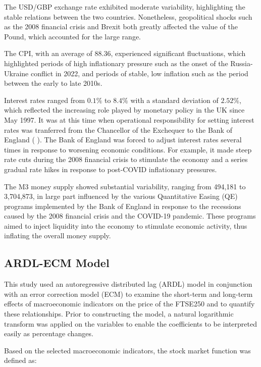 \documentclass[11pt,a4paper]{article}
\newcommand{\citeboth}[1]{\citeauthor{#1} \citep{#1}}
\begin{document}
The USD/GBP exchange rate exhibited moderate variability, highlighting the stable relations between 
the two countries. Nonetheless, geopolitical shocks such as the 2008 financial crisis and Brexit both greatly affected the value of the Pound, 
which accounted for the large range. 

The CPI, with an average of 88.36, 
experienced significant fluctuations, which highlighted periods of high inflationary pressure such as the onset of the Russia-Ukraine conflict in 2022, and periods of stable, low
inflation such as the period between the early to late 2010s.

Interest rates ranged from $0.1\%$ to $8.4\%$ with a standard deviation of $2.52\%$, which reflected the 
increasing role played by monetary policy in the UK since May 1997. It was at this time when operational responsibility for setting interest rates was tranferred from the Chancellor of the Exchequer to the Bank of England (\citeboth{king1997changes}). 
The Bank of England was forced to adjust interest rates 
several times in response to worsening economic conditions. For example, 
it made steep rate cuts during the 2008 financial crisis
to stimulate the economy and a series gradual rate hikes in response to 
post-COVID inflationary pressures. 

The M3 money supply showed substantial variability, ranging from 494,181 to 3,704,873, 
in large part influenced by the various Quantitative Easing (QE) programs implemented by the Bank of England 
in response to the recessions caused by the 2008 financial crisis and the COVID-19 pandemic. These programs aimed to inject liquidity into the economy to stimulate economic activity, thus inflating the overall money supply.

\subsection{ARDL-ECM Model}

This study used an autoregressive distributed lag (ARDL) model in conjunction with 
an error correction model (ECM) to examine the short-term and long-term effects of macroeconomic indicators on the price of the FTSE250
and to quantify these relationships. Prior to constructing the model,
a natural logarithmic transform was applied
on the variables to enable the coefficients to be interpreted 
easily as percentage changes. 

Based on the selected macroeconomic indicators,
the stock market function was defined as:
\end{document}
